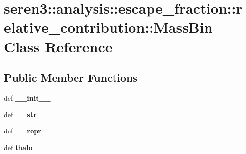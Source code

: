 \hypertarget{classseren3_1_1analysis_1_1escape__fraction_1_1relative__contribution_1_1MassBin}{
\section{seren3::analysis::escape\_\-fraction::relative\_\-contribution::MassBin Class Reference}
\label{classseren3_1_1analysis_1_1escape__fraction_1_1relative__contribution_1_1MassBin}
}
\subsection*{Public Member Functions}
\begin{DoxyCompactItemize}
\item 
\hypertarget{classseren3_1_1analysis_1_1escape__fraction_1_1relative__contribution_1_1MassBin_ac7e1271bdea88f1c1989cd07c1c2995e}{
def {\bfseries \_\-\_\-init\_\-\_\-}}
\label{classseren3_1_1analysis_1_1escape__fraction_1_1relative__contribution_1_1MassBin_ac7e1271bdea88f1c1989cd07c1c2995e}

\item 
\hypertarget{classseren3_1_1analysis_1_1escape__fraction_1_1relative__contribution_1_1MassBin_af7489e80944c54ee9316a95391180a1f}{
def {\bfseries \_\-\_\-str\_\-\_\-}}
\label{classseren3_1_1analysis_1_1escape__fraction_1_1relative__contribution_1_1MassBin_af7489e80944c54ee9316a95391180a1f}

\item 
\hypertarget{classseren3_1_1analysis_1_1escape__fraction_1_1relative__contribution_1_1MassBin_a7d0d5f9b9984a9f2aef396f1ab78d216}{
def {\bfseries \_\-\_\-repr\_\-\_\-}}
\label{classseren3_1_1analysis_1_1escape__fraction_1_1relative__contribution_1_1MassBin_a7d0d5f9b9984a9f2aef396f1ab78d216}

\item 
\hypertarget{classseren3_1_1analysis_1_1escape__fraction_1_1relative__contribution_1_1MassBin_a63c5e8dd54f5ecfea160901122e67f0e}{
def {\bfseries thalo}}
\label{classseren3_1_1analysis_1_1escape__fraction_1_1relative__contribution_1_1MassBin_a63c5e8dd54f5ecfea160901122e67f0e}

\end{DoxyCompactItemize}
